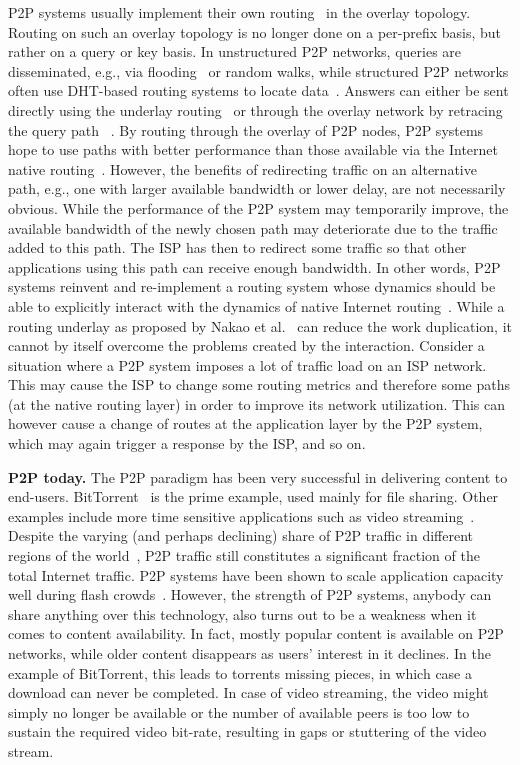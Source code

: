 P2P systems usually implement their own routing~\cite{abkm-ron-01} in the
overlay topology. Routing on such an overlay topology is no longer done on a
per-prefix basis, but rather on a query or key basis. In unstructured P2P
networks, queries are disseminated, e.g., via flooding~\cite{Gnutellav0.6} or
random walks, while structured P2P networks often use DHT-based routing systems
to locate data~\cite{P2P-LNCS-05}. Answers can either be sent directly using
the underlay routing~\cite{P2P-LNCS-05} or through the overlay network by
retracing the query path~ \cite{Gnutellav0.6}. By routing through the overlay
of P2P nodes, P2P systems hope to use paths with better performance than those
available via the Internet native routing~\cite{abkm-ron-01,sch-eeips-99}.
However, the benefits of redirecting traffic on an alternative path, e.g., one
with larger available bandwidth or lower delay, are not necessarily obvious.
While the performance of the P2P system may temporarily improve, the available
bandwidth of the newly chosen path may deteriorate due to the traffic added to
this path. The ISP has then to redirect some traffic so that other applications
using this path can receive enough bandwidth. In other words, P2P systems
reinvent and re-implement a routing system whose dynamics should be able to
explicitly interact with the dynamics of native Internet
routing~\cite{ktci-cithon-04,sa-oidronl-06}.  While a routing underlay as
proposed by Nakao et al.~\cite{npb-ruon-03} can reduce the work duplication, it
cannot by itself overcome the problems created by the interaction. Consider a
situation where a P2P system imposes a lot of traffic load on an ISP network.
This may cause the ISP to change some routing metrics and therefore some paths
(at the native routing layer) in order to improve its network utilization. This
can however cause a change of routes at the application layer by the P2P
system, which may again trigger a response by the ISP, and so on.

\noindent\textbf{P2P today.}\label{sec:P2P-today}
The P2P paradigm has been very successful in delivering content to end-users.
BitTorrent~\cite {BTCohen} is the prime example, used mainly for file sharing.
Other examples include more time sensitive applications such as video
streaming~\cite{Conviva2011,Conviva2012,Video-IMC2012}. Despite the varying
(and perhaps declining) share of P2P traffic in different regions of the
world~\cite{OnDominantCharacteristics2009}, P2P traffic still constitutes a
significant fraction of the total Internet traffic. P2P systems have been shown
to scale application capacity well during flash crowds~\cite{BTCapacity}.
However, the strength of P2P systems, \ie anybody can share anything over this
technology, also turns out to be a weakness when it comes to content
availability. In fact, mostly popular content is available on P2P networks,
while older content disappears as users' interest in it declines. In the
example of BitTorrent, this leads to torrents missing pieces,
in which case a download can never be completed. In case of video streaming,
the video might simply no longer be available or the number of available peers
is too low to sustain the required video bit-rate, resulting in gaps or
stuttering of the video stream.

